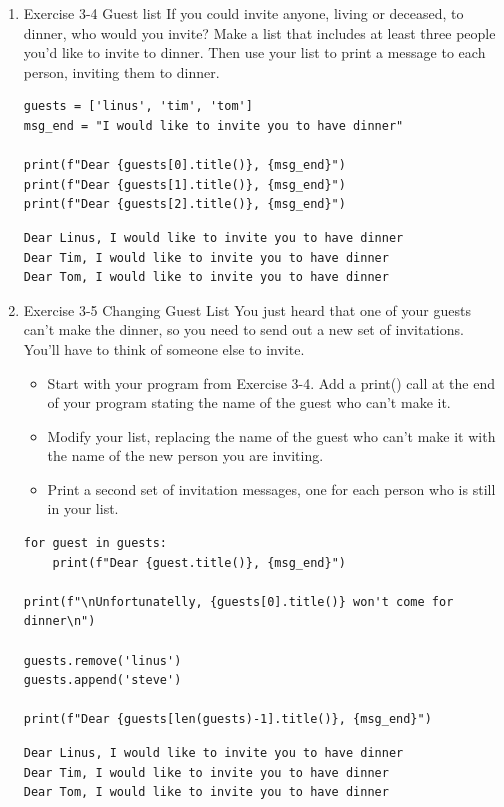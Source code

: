 \documentclass[10pt]{book}
\begin{document}
\begin{enumerate}
\item Exercise 3-4 Guest list
\label{sec:orgd87fd1e}
If you could invite anyone, living or deceased, to dinner, who would you invite? Make a list that includes at least three people you’d like to invite to dinner. Then use your list to print a message to each person, inviting them to dinner.
\begin{verbatim}
guests = ['linus', 'tim', 'tom']
msg_end = "I would like to invite you to have dinner"

print(f"Dear {guests[0].title()}, {msg_end}")
print(f"Dear {guests[1].title()}, {msg_end}")
print(f"Dear {guests[2].title()}, {msg_end}")
\end{verbatim}

\label{org7516bb7}
\begin{verbatim}
Dear Linus, I would like to invite you to have dinner
Dear Tim, I would like to invite you to have dinner
Dear Tom, I would like to invite you to have dinner
\end{verbatim}
\item Exercise 3-5 Changing Guest List
\label{sec:org1f9d59d}
You just heard that one of your guests can’t make the dinner, so you need to send out a new set of invitations. You’ll have to think of someone else to invite.
\begin{itemize}
\item Start with your program from Exercise 3-4. Add a print() call at the end of your program stating the name of the guest who can’t make it.
\item Modify your list, replacing the name of the guest who can’t make it with the name of the new person you are inviting.
\item Print a second set of invitation messages, one for each person who is still in your list.
\end{itemize}
\begin{verbatim}
for guest in guests:
    print(f"Dear {guest.title()}, {msg_end}")

print(f"\nUnfortunatelly, {guests[0].title()} won't come for dinner\n")

guests.remove('linus')
guests.append('steve')

print(f"Dear {guests[len(guests)-1].title()}, {msg_end}")
\end{verbatim}

\label{org36bc635}
\begin{verbatim}
Dear Linus, I would like to invite you to have dinner
Dear Tim, I would like to invite you to have dinner
Dear Tom, I would like to invite you to have dinner


\end{verbatim}
\end{enumerate}
\end{document}
